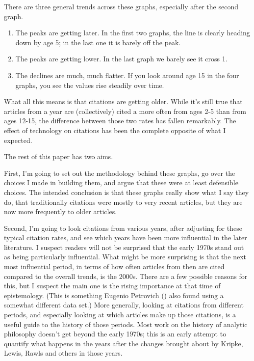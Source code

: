 \documentclass[
  12pt,
  letterpaper,
  DIV=11,
  numbers=noendperiod]{scrartcl}
\providecommand{\tightlist}{%
  \setlength{\itemsep}{0pt}\setlength{\parskip}{0pt}}
\begin{document}
There are three general trends across these graphs, especially after the
second graph.

\begin{enumerate}
\def\labelenumi{\arabic{enumi}.}
\tightlist
\item
  The peaks are getting later. In the first two graphs, the line is
  clearly heading down by age 5; in the last one it is barely off the
  peak.
\item
  The peaks are getting lower. In the last graph we barely see it cross
  1.
\item
  The declines are much, much flatter. If you look around age 15 in the
  four graphs, you see the values rise steadily over time.
\end{enumerate}

What all this means is that citations are getting older. While it's
still true that articles from a year are (collectively) cited a more
often from ages 2-5 than from ages 12-15, the difference between those
two rates has fallen remarkably. The effect of technology on citations
has been the complete opposite of what I expected.

The rest of this paper has two aims.

First, I'm going to set out the methodology behind these graphs, go over
the choices I made in building them, and argue that these were at least
defensible choices. The intended conclusion is that these graphs really
show what I say they do, that traditionally citations were mostly to
very recent articles, but they are now more frequently to older
articles.

Second, I'm going to look citations from various years, after adjusting
for these typical citation rates, and see which years have been more
influential in the later literature. I suspect readers will not be
surprised that the early 1970s stand out as being particularly
influential. What might be more surprising is that the next most
influential period, in terms of how often articles from then are cited
compared to the overall trends, is the 2000s. There are a few possible
reasons for this, but I suspect the main one is the rising importance at
that time of epistemology. (This is something Eugenio Petrovich
() also found using a somewhat
different data set.) More generally, looking at citations from different
periods, and especially looking at which articles make up those
citations, is a useful guide to the history of those periods. Most work
on the history of analytic philosophy doesn't get beyond the early
1970s; this is an early attempt to quantify what happens in the years
after the changes brought about by Kripke, Lewis, Rawls and others in
those years.
\end{document}

